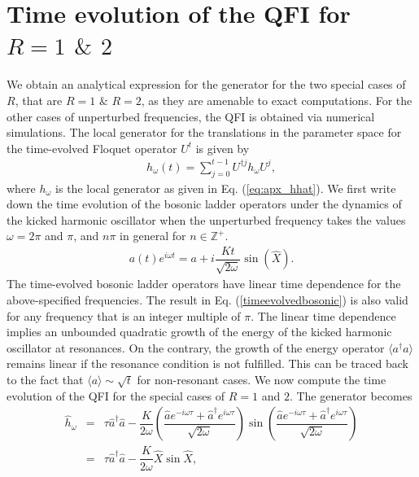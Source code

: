 \documentclass[amsmath,nobibnotes,aps,amssymb,pra, prl,aps,showpacs,superscriptaddress,twocolumn, longbibliography, reprint]{revtex4-2}
\begin{document}


\section{Time evolution of the QFI for $R=1$ $\&$ $2$}
\label{appendix:b}
We obtain an analytical expression for the generator for the two special cases of $R$, that are $R=1$ $\&$ $R=2$, as they are amenable to exact computations. For the other cases of unperturbed frequencies, the QFI is obtained via numerical simulations. The local generator for the translations in the parameter space for the time-evolved Floquet operator $U^t$ is given by
\begin{eqnarray}\label{tevolgen}
h_{\omega}(t)=\sum_{j=0}^{t-1}U^{\dagger j}h_{\omega} U^{j},
\end{eqnarray}
where $h_{\omega}$ is the local generator as given in Eq. (\ref{eq:apx_hhat}). We first write down the time evolution of the bosonic ladder operators under the dynamics of the kicked harmonic oscillator when the unperturbed frequency takes the values $\omega=2\pi$ and $\pi$, and $n\pi$ in general for $n\in\mathbb{Z}^+$.
\begin{eqnarray}\label{timeevolvedbosonic}
a(t)e^{i\omega t}=a+i\dfrac{Kt}{\sqrt{2\omega}}\sin\left( \hat{X} \right).
\end{eqnarray}
The time-evolved bosonic ladder operators have linear time dependence for the above-specified frequencies. The result in Eq. (\ref{timeevolvedbosonic}) is also valid for any frequency that is an integer multiple of $\pi$. The linear time dependence implies an unbounded quadratic growth of the energy of the kicked harmonic oscillator at resonances. On the contrary, the growth of the energy operator $\langle a^\dagger a\rangle$ remains linear if the resonance condition is not fulfilled. This can be traced back to the fact that $\langle a\rangle\sim\sqrt{t}$ for non-resonant cases. We now compute the time evolution of the QFI for the special cases of $R=1$ and $2$. The generator becomes
\begin{eqnarray}\label{gen}
\hat{h}_{\omega}&=&\tau \hat{a}^\dagger \hat{a}-\dfrac{K}{2\omega}\left( \dfrac{\hat{a}e^{-i\omega\tau}+\hat{a}^\dagger e^{i\omega\tau}}{\sqrt{2\omega}} \right)\sin\left( \dfrac{\hat{a}e^{-i\omega\tau}+\hat{a}^\dagger e^{i\omega\tau}}{\sqrt{2\omega}} \right)\nonumber\\
&=&\tau \hat{a}^\dagger \hat{a}-\dfrac{K}{2\omega}\hat{X}\sin\hat{X},
\end{eqnarray}
\end{document}
